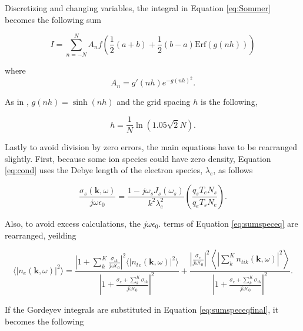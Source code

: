 \noindent Discretizing and changing variables, the integral in Equation \ref{eq:Sommer} becomes the following sum

\begin{equation}
\label{eq:erfsum1}
I=\displaystyle \sum_{n=-N}^N A_nf\left( \frac{1}{2}(a+b)+\frac{1}{2} (b-a)\text{Erf}(g(nh))\right)
\end{equation}

\noindent where
\begin{equation}
\label{eq:anterm}
A_n = g'(nh)e^{-g(nh)^2}.
\end{equation}

\noindent As in \citep{Ooi:2007jx}, $g(nh) = \sinh (nh)$ and the grid spacing $h$ is the following,

\begin{equation}
\label{eq:hterm}
h = \frac{1}{N}\ln(1.05\sqrt{2}N).
\end{equation} 


Lastly to avoid division by zero errors, the main equations have to be rearranged slightly. First, because some ion species could have zero density, Equation \ref{eq:cond} uses the Debye length of the electron species, $\lambda_e$, as follows

\begin{equation}
\label{eq:condnew}
\frac{\sigma_{s}(\mathbf{k},\omega)}{j\omega\epsilon_0} = \frac{1-j\omega_s J_s(\omega_s)}{k^2\lambda_e^2} \left(\frac{q_sT_eN_s}{q_eT_sN_e}\right).
\end{equation}

Also, to avoid excess calculations, the $j\omega\epsilon_0$. terms of Equation \ref{eq:sumspeceq} are rearranged, yeilding

\begin{equation}
\label{eq:sumspeceqfinal}
\displaystyle \langle \left|n_e(\mathbf{k},\omega)\right|^2\rangle =  \frac{\left|1 +  \sum_k^K\frac{\sigma_{ik}}{j\omega\epsilon_0} \right|^2 \langle |n_{te}(\mathbf{k},\omega)|^2\rangle}{\left|1 +\frac{\sigma_e+ \sum_k^K\sigma_{ik}}{j\omega\epsilon_0} \right|^2} + \frac{\left| \frac{\sigma_e}{j\omega\epsilon_0} \right|^2\left \langle \left|\sum_k^Kn_{tik}(\mathbf{k},\omega)\right|^2\right\rangle}{\left|1 +\frac{\sigma_e+ \sum_k^K\sigma_{ik}}{j\omega\epsilon_0} \right|^2}.
\end{equation}

\noindent If the Gordeyev integrals are substituted in Equation \ref{eq:sumspeceqfinal}, it becomes the following

